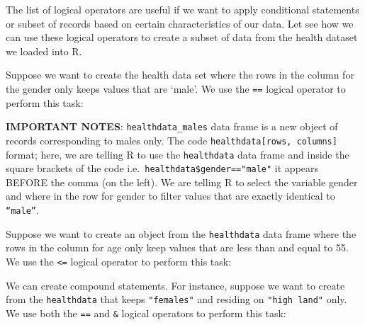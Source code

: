 \documentclass[
]{book}
\newenvironment{Shaded}{\begin{snugshade}}{\end{snugshade}}
\newcommand{\DecValTok}[1]{\textcolor[rgb]{0.00,0.00,0.81}{#1}}
\newcommand{\NormalTok}[1]{#1}
\newcommand{\OtherTok}[1]{\textcolor[rgb]{0.56,0.35,0.01}{#1}}
\newcommand{\SpecialCharTok}[1]{\textcolor[rgb]{0.00,0.00,0.00}{#1}}
\newcommand{\StringTok}[1]{\textcolor[rgb]{0.31,0.60,0.02}{#1}}
\begin{document}
The list of logical operators are useful if we want to apply conditional statements or subset of records based on certain characteristics of our data. Let see how we can use these logical operators to create a subset of data from the health dataset we loaded into R.

Suppose we want to create the health data set where the rows in the column for the gender only keeps values that are `male'. We use the \texttt{==} logical operator to perform this task:

\begin{Shaded}
\end{Shaded}

\textbf{IMPORTANT NOTES}: \texttt{healthdata\_males} data frame is a new object of records corresponding to males only. The code \texttt{healthdata{[}rows,\ columns{]}} format; here, we are telling R to use the \texttt{healthdata} data frame and inside the square brackets of the code i.e.~\texttt{healthdata\$gender=="male"} it appears BEFORE the comma (on the left). We are telling R to select the variable gender and where in the row for gender to filter values that are exactly identical to \texttt{“male”}.

Suppose we want to create an object from the \texttt{healthdata} data frame where the rows in the column for age only keep values that are less than and equal to 55. We use the \texttt{\textless{}=} logical operator to perform this task:

\begin{Shaded}
\end{Shaded}

We can create compound statements. For instance, suppose we want to create from the \texttt{healthdata} that keeps \texttt{"females"} and residing on \texttt{"high\ land"} only. We use both the \texttt{==} and \texttt{\&} logical operators to perform this task:

\begin{Shaded}
\end{Shaded}
\end{document}
